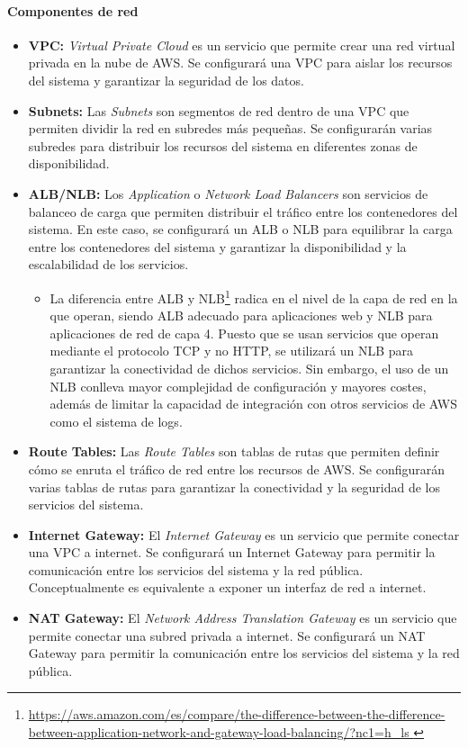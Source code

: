\paragraph{Componentes de red}
\begin{itemize}
	\item \textbf{VPC:} \textit{Virtual Private Cloud} es un servicio que permite
		crear una red virtual privada en la nube de AWS. Se configurará una VPC
		para aislar los recursos del sistema y garantizar la seguridad de los
		datos.
	\item \textbf{Subnets:} Las \textit{Subnets} son segmentos de red dentro de
		una VPC que permiten dividir la red en subredes más pequeñas. Se
		configurarán varias subredes para distribuir los recursos del sistema en
		diferentes zonas de disponibilidad.
		\item \textbf{ALB/NLB:} Los \textit{Application} o \textit{Network Load
		Balancers} son servicios de balanceo de carga que permiten distribuir
		el tráfico entre los contenedores del sistema. En este caso, se
		configurará un ALB o NLB para equilibrar la carga entre los contenedores
		del sistema y garantizar la disponibilidad y la escalabilidad de los
		servicios. \begin{itemize}
			\item La diferencia entre ALB y NLB\footnote{\url{
					https://aws.amazon.com/es/compare/the-difference-between-the-difference-between-application-network-and-gateway-load-balancing/?nc1=h_ls
				}} radica en el nivel de la capa de red en la que operan, siendo
				ALB adecuado para aplicaciones web y NLB para aplicaciones de
				red de capa 4. Puesto que se usan servicios que operan
				mediante el protocolo TCP y no HTTP, se utilizará un NLB para
				garantizar la conectividad de dichos servicios. Sin embargo, el
				uso de un NLB conlleva mayor complejidad de configuración y
				mayores costes, además de limitar la capacidad de integración
				con otros servicios de AWS como el sistema de logs.
		\end{itemize}
	\item \textbf{Route Tables:} Las \textit{Route Tables} son tablas de rutas
		que permiten definir cómo se enruta el tráfico de red entre los
		recursos de AWS. Se configurarán varias tablas de rutas para garantizar
		la conectividad y la seguridad de los servicios del sistema.
	\item \textbf{Internet Gateway:} El \textit{Internet Gateway} es un servicio
		que permite conectar una VPC a internet. Se configurará un Internet
		Gateway para permitir la comunicación entre los servicios del sistema y
		la red pública. Conceptualmente es equivalente a exponer un interfaz de
		red a internet.
	\item \textbf{NAT Gateway:} El \textit{Network Address Translation Gateway}
		es un servicio que permite conectar una subred privada a internet. Se
		configurará un NAT Gateway para permitir la comunicación entre los
		servicios del sistema y la red pública.
\end{itemize}

